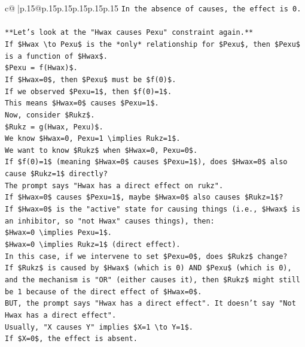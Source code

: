 \documentclass{article}
\begin{document}
{\begin{supertabular}{c@{$\;$}|p{.15\linewidth}@{}p{.15\linewidth}p{.15\linewidth}p{.15\linewidth}p{.15\linewidth}p{.15\linewidth}}
{{{\texttt{In the absence of causes, the effect is 0.} \\
\\ 
\texttt{**Let's look at the "Hwax causes Pexu" constraint again.**} \\
\texttt{If \$Hwax \textbackslash{}to Pexu\$ is the *only* relationship for \$Pexu\$, then \$Pexu\$ is a function of \$Hwax\$.} \\
\texttt{\$Pexu = f(Hwax)\$.} \\
\texttt{If \$Hwax=0\$, then \$Pexu\$ must be \$f(0)\$.} \\
\texttt{If we observed \$Pexu=1\$, then \$f(0)=1\$.} \\
\texttt{This means \$Hwax=0\$ causes \$Pexu=1\$.} \\
\texttt{Now, consider \$Rukz\$.} \\
\texttt{\$Rukz = g(Hwax, Pexu)\$.} \\
\texttt{We know \$Hwax=0, Pexu=1 \textbackslash{}implies Rukz=1\$.} \\
\texttt{We want to know \$Rukz\$ when \$Hwax=0, Pexu=0\$.} \\
\texttt{If \$f(0)=1\$ (meaning \$Hwax=0\$ causes \$Pexu=1\$), does \$Hwax=0\$ also cause \$Rukz=1\$ directly?} \\
\texttt{The prompt says "Hwax has a direct effect on rukz".} \\
\texttt{If \$Hwax=0\$ causes \$Pexu=1\$, maybe \$Hwax=0\$ also causes \$Rukz=1\$?} \\
\texttt{If \$Hwax=0\$ is the "active" state for causing things (i.e., \$Hwax\$ is an inhibitor, so "not Hwax" causes things), then:} \\
\texttt{\$Hwax=0 \textbackslash{}implies Pexu=1\$.} \\
\texttt{\$Hwax=0 \textbackslash{}implies Rukz=1\$ (direct effect).} \\
\texttt{In this case, if we intervene to set \$Pexu=0\$, does \$Rukz\$ change?} \\
\texttt{If \$Rukz\$ is caused by \$Hwax\$ (which is 0) AND \$Pexu\$ (which is 0), and the mechanism is "OR" (either causes it), then \$Rukz\$ might still be 1 because of the direct effect of \$Hwax=0\$.} \\
\texttt{BUT, the prompt says "Hwax has a direct effect". It doesn't say "Not Hwax has a direct effect".} \\
\texttt{Usually, "X causes Y" implies \$X=1 \textbackslash{}to Y=1\$.} \\
\texttt{If \$X=0\$, the effect is absent.} \\
}}}
\end{supertabular}}
\end{document}
